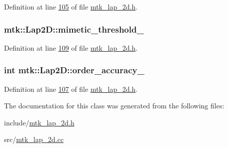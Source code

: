 Definition at line \hyperlink{mtk__lap__2d_8h_source_l00105}{105} of file \hyperlink{mtk__lap__2d_8h_source}{mtk\+\_\+lap\+\_\+2d.\+h}.

\hypertarget{classmtk_1_1Lap2D_a5501bd196f7307f64d6fa58da070196e}{
\subsubsection[{mimetic\+\_\+threshold\+\_\+}]{ mtk\+::\+Lap2\+D\+::mimetic\+\_\+threshold\+\_\+\hspace{0.3cm}{\ttfamily [private]}}}\label{classmtk_1_1Lap2D_a5501bd196f7307f64d6fa58da070196e}


Definition at line \hyperlink{mtk__lap__2d_8h_source_l00109}{109} of file \hyperlink{mtk__lap__2d_8h_source}{mtk\+\_\+lap\+\_\+2d.\+h}.

\hypertarget{classmtk_1_1Lap2D_a9c4fdfe20a093b19f3b3f7ff0c49f560}{
\subsubsection[{order\+\_\+accuracy\+\_\+}]{\setlength{\rightskip}{0pt plus 5cm}int mtk\+::\+Lap2\+D\+::order\+\_\+accuracy\+\_\+\hspace{0.3cm}{\ttfamily [private]}}}\label{classmtk_1_1Lap2D_a9c4fdfe20a093b19f3b3f7ff0c49f560}


Definition at line \hyperlink{mtk__lap__2d_8h_source_l00107}{107} of file \hyperlink{mtk__lap__2d_8h_source}{mtk\+\_\+lap\+\_\+2d.\+h}.



The documentation for this class was generated from the following files\+:\begin{DoxyCompactItemize}
\item 
include/\hyperlink{mtk__lap__2d_8h}{mtk\+\_\+lap\+\_\+2d.\+h}\item 
src/\hyperlink{mtk__lap__2d_8cc}{mtk\+\_\+lap\+\_\+2d.\+cc}\end{DoxyCompactItemize}
